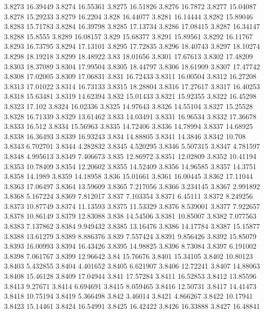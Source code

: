 3.8273  16.39449
3.8274  16.55361
3.8275  16.51826
3.8276  16.7872
3.8277  15.04087
3.8278  15.29233
3.8279  16.2204
3.828  16.44077
3.8281  16.14444
3.8282  15.89046
3.8283  15.71783
3.8284  16.39798
3.8285  17.13734
3.8286  17.08415
3.8287  16.34147
3.8288  15.8555
3.8289  16.08157
3.829  15.68377
3.8291  15.89561
3.8292  16.11767
3.8293  16.73795
3.8294  17.13101
3.8295  17.72835
3.8296  18.40743
3.8297  18.10274
3.8298  18.19218
3.8299  18.48922
3.83  18.01656
3.8301  17.67613
3.8302  17.48209
3.8303  18.37089
3.8304  17.99504
3.8305  18.44797
3.8306  18.61909
3.8307  17.47742
3.8308  17.02005
3.8309  17.06831
3.831  16.72433
3.8311  16.00504
3.8312  16.27208
3.8313  17.01022
3.8314  16.73133
3.8315  18.28804
3.8316  17.27617
3.8317  16.40253
3.8318  15.63481
3.8319  14.62394
3.832  15.01433
3.8321  15.92355
3.8322  16.45298
3.8323  17.102
3.8324  16.02336
3.8325  14.97643
3.8326  14.55104
3.8327  15.25528
3.8328  16.71339
3.8329  13.61462
3.833  14.03491
3.8331  16.96534
3.8332  17.36678
3.8333  16.512
3.8334  15.56963
3.8335  14.72406
3.8336  14.78994
3.8337  14.68925
3.8338  16.36493
3.8339  16.93243
3.834  14.88805
3.8341  14.3846
3.8342  10.708
3.8343  6.702701
3.8344  4.282832
3.8345  4.520295
3.8346  5.507315
3.8347  4.781597
3.8348  4.995613
3.8349  7.406673
3.835  12.86972
3.8351  12.02809
3.8352  10.41194
3.8353  10.78409
3.8354  12.20602
3.8355  14.52409
3.8356  14.96585
3.8357  14.3751
3.8358  14.1989
3.8359  14.18958
3.836  15.01661
3.8361  16.00445
3.8362  17.11044
3.8363  17.06497
3.8364  13.59609
3.8365  7.217056
3.8366  3.234145
3.8367  2.991892
3.8368  5.167224
3.8369  7.812017
3.837  7.103354
3.8371  6.45111
3.8372  8.249256
3.8373  10.87749
3.8374  11.13593
3.8375  11.53329
3.8376  8.539001
3.8377  7.922657
3.8378  10.86149
3.8379  12.83088
3.838  14.54506
3.8381  10.85007
3.8382  7.077563
3.8383  7.137862
3.8384  9.949432
3.8385  13.16476
3.8386  14.17784
3.8387  15.15877
3.8388  13.61279
3.8389  8.886376
3.839  7.557424
3.8391  9.856426
3.8392  15.85079
3.8393  16.00993
3.8394  16.43426
3.8395  14.98825
3.8396  8.73084
3.8397  6.191002
3.8398  7.061767
3.8399  12.96642
3.84  15.76676
3.8401  15.34105
3.8402  10.80123
3.8403  5.432855
3.8404  4.401652
3.8405  6.621907
3.8406  12.72241
3.8407  14.88063
3.8408  15.46128
3.8409  17.04944
3.841  17.57284
3.8411  16.52853
3.8412  13.85596
3.8413  9.27671
3.8414  6.694691
3.8415  8.059465
3.8416  12.50731
3.8417  14.41473
3.8418  10.75194
3.8419  5.366498
3.842  3.46014
3.8421  4.866267
3.8422  10.17941
3.8423  15.14461
3.8424  16.54991
3.8425  16.42422
3.8426  16.33888
3.8427  16.48841
